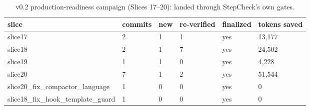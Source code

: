 \documentclass{article}
\begin{document}
\begin{table}[h]
\centering
\begin{tabular}{llllll}
\toprule
slice & commits & new & re-verified & finalized & tokens saved \\
\midrule
slice17 & 2 & 1 & 1 & yes & 13,177 \\
slice18 & 2 & 1 & 7 & yes & 24,502 \\
slice19 & 1 & 1 & 0 & yes & 4,228 \\
slice20 & 7 & 1 & 2 & yes & 51,544 \\
slice20\_fix\_compactor\_language & 1 & 0 & 0 & yes & 0 \\
slice18\_fix\_hook\_template\_guard & 1 & 0 & 0 & yes & 0 \\
\bottomrule
\end{tabular}
\caption{v0.2 production-readiness campaign (Slices 17–20): landed through StepCheck's own gates.}
\label{tab:dogfood17_20}
\end{table}
\end{document}
